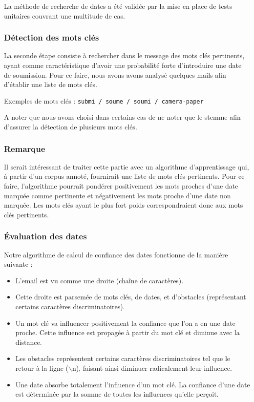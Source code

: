 \documentclass[a4paper,french,10pt]{article}
\begin{document}
La méthode de recherche de dates a été validée par la mise en place de tests unitaires couvrant une multitude de cas.

\subsubsection{Détection des mots clés}
La seconde étape consiste à rechercher dans le message des mots clés pertinents, ayant comme caractéristique d'avoir une probabilité forte d'introduire une date de soumission. Pour ce faire, nous avons avons analysé quelques mails afin d'établir une liste de mots clés.

Exemples de mots clés : \texttt{submi / soume / soumi / camera-paper}

A noter que nous avons choisi dans certains cas de ne noter que le stemme afin d'assurer la détection de plusieurs mots clés.

\subsubsection*{Remarque}
Il serait intéressant de traiter cette partie avec un algorithme d'apprentissage qui, à partir d'un corpus annoté, fournirait une liste de mots clés pertinents. Pour ce faire, l'algorithme pourrait pondérer positivement les mots proches d'une date marquée comme pertinente et négativement les mots proche d'une date non marquée. Les mots clés ayant le plus fort poids correspondraient donc aux mots clés pertinents.

\subsubsection{Évaluation des dates}

Notre algorithme de calcul de confiance des dates fonctionne de la manière suivante :

\begin{itemize}
\item L'email est vu comme une droite (chaîne de caractères).
\item Cette droite est parsemée de mots clés, de dates, et d'obstacles (représentant certains caractères discriminatoires).
\item Un mot clé va influencer positivement la confiance que l'on a en une date proche. Cette influence est propagée à partir du mot clé et diminue avec la distance.
\item Les obstacles représentent certains caractères discriminatoires tel que le retour à la ligne ($\backslash$n), faisant ainsi diminuer radicalement leur influence.
\item Une date absorbe totalement l'influence d'un mot clé. La confiance d'une date est déterminée par la somme de toutes les influences qu'elle perçoit.
\end{itemize}
\end{document}
